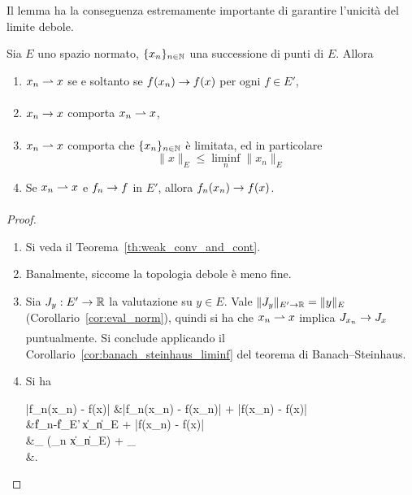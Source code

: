 \begin{remark}
	Il lemma ha la conseguenza estremamente importante di garantire l'unicità del limite debole.
\end{remark}

\begin{lemma}
\label{lemma:weaktop_five}
	Sia $E$ uno spazio normato, $\{x_n\}_{n \in \mathbb{N}}$ una successione di punti di $E$. Allora
	\begin{enumerate}
		\item $x_n \rightharpoonup x$ se e soltanto se $f(x_n) \underset{{}}{\rightarrow} f(x)$ per ogni $f \in E'$,
		\item $x_n \underset{{}}{\rightarrow} x$ comporta $x_n \rightharpoonup x$,
		\item $x_n \rightharpoonup x$ comporta che $\{x_n\}_{n \in \mathbb{N}}$ è limitata, ed in particolare
		\begin{equation*}
			\|x\|_E \leq \liminf_n \|x_n\|_E
		\end{equation*}
		\item Se $x_n \rightharpoonup x$ e $f_n \underset{{}}{\rightarrow} f$ in $E'$, allora $f_n(x_n) \underset{{}}{\rightarrow} f(x)$.
	\end{enumerate}
\end{lemma}
\begin{proof}
	\leavevmode
	\begin{enumerate}
		\item Si veda il Teorema~\ref{th:weak_conv_and_cont}.
		\item Banalmente, siccome la topologia debole è meno fine.
		\item Sia $J_y : E' \to \mathbb{R}$ la valutazione su $y \in E$. Vale $\|J_y\|_{E' \to \mathbb{R}} = \|y\|_E$ (Corollario~\ref{cor:eval_norm}), quindi si ha che $x_n \rightharpoonup x$ implica $J_{x_n} \underset{{}}{\rightarrow} J_x$ puntualmente. Si conclude applicando il Corollario~\ref{cor:banach_steinhaus_liminf} del teorema di Banach--Steinhaus.
		\item Si ha
		\begin{eqalign*}
			|f_n(x_n) - f(x)| &\leq |f_n(x_n) - f(x_n)| + |f(x_n) - f(x)|\\
			&\leq \|f_n-f\|_{E'}\,\|x_n\|_E + |f(x_n) - f(x)|\\
			&\leq {}_{} (\liminf_n \|x_n\|_E) + _{}\\[-1.5ex]
			&.\\[-1ex]
		\end{eqalign*}
	\end{enumerate}
\end{proof}

